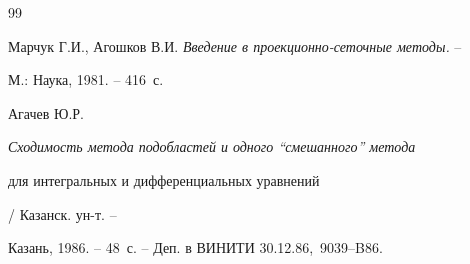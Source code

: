 \begin{thebibliography}{99}


Марчук Г.И., Агошков В.И. {\it Введение в проекционно-сеточные методы.} --


М.: Наука, 1981. -- 416~с.




Агачев Ю.Р. {\it Сходимость метода подобластей и одного ``смешанного'' метода


для интегральных и дифференциальных уравнений} / Казанск. ун-т. --


Казань, 1986. -- 48~с. -- Деп. в ВИНИТИ 30.12.86, \No\,9039--B86.





\end{thebibliography}





\vskip 2cm









\smallskip









\label{end}








